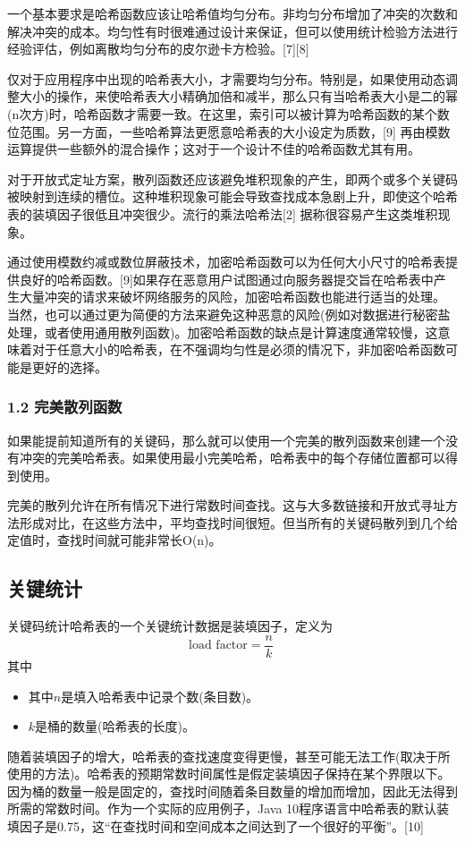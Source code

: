 一个基本要求是哈希函数应该让哈希值均匀分布。非均匀分布增加了冲突的次数和解决冲突的成本。均匀性有时很难通过设计来保证，但可以使用统计检验方法进行经验评估，例如离散均匀分布的皮尔逊卡方检验。[7][8]

仅对于应用程序中出现的哈希表大小，才需要均匀分布。特别是，如果使用动态调整大小的操作，来使哈希表大小精确加倍和减半，那么只有当哈希表大小是二的幂(n次方)时，哈希函数才需要一致。在这里，索引可以被计算为哈希函数的某个数位范围。另一方面，一些哈希算法更愿意哈希表的大小设定为质数，[9] 再由模数运算提供一些额外的混合操作；这对于一个设计不佳的哈希函数尤其有用。

对于开放式定址方案，散列函数还应该避免堆积现象的产生，即两个或多个关键码被映射到连续的槽位。这种堆积现象可能会导致查找成本急剧上升，即使这个哈希表的装填因子很低且冲突很少。流行的乘法哈希法[2] 据称很容易产生这类堆积现象。

通过使用模数约减或数位屏蔽技术，加密哈希函数可以为任何大小尺寸的哈希表提供良好的哈希函数。[9]如果存在恶意用户试图通过向服务器提交旨在哈希表中产生大量冲突的请求来破坏网络服务的风险，加密哈希函数也能进行适当的处理。 当然，也可以通过更为简便的方法来避免这种恶意的风险(例如对数据进行秘密盐处理，或者使用通用散列函数)。加密哈希函数的缺点是计算速度通常较慢，这意味着对于任意大小的哈希表，在不强调均匀性是必须的情况下，非加密哈希函数可能是更好的选择。

\subsubsection{1.2 完美散列函数}
如果能提前知道所有的关键码，那么就可以使用一个完美的散列函数来创建一个没有冲突的完美哈希表。如果使用最小完美哈希，哈希表中的每个存储位置都可以得到使用。

完美的散列允许在所有情况下进行常数时间查找。这与大多数链接和开放式寻址方法形成对比，在这些方法中，平均查找时间很短。但当所有的关键码散列到几个给定值时，查找时间就可能非常长O(n)。

\subsection{关键统计}
关键码统计哈希表的一个关键统计数据是装填因子，定义为
\begin{equation}
\text{load factor} = \frac{n}{k}~
\end{equation}
其中
\begin{itemize}
\item 其中$n$是填入哈希表中记录个数(条目数)。
\item $k$是桶的数量(哈希表的长度)。
\end{itemize}
随着装填因子的增大，哈希表的查找速度变得更慢，甚至可能无法工作(取决于所使用的方法)。哈希表的预期常数时间属性是假定装填因子保持在某个界限以下。因为桶的数量一般是固定的，查找时间随着条目数量的增加而增加，因此无法得到所需的常数时间。作为一个实际的应用例子，Java 10程序语言中哈希表的默认装填因子是0.75，这“在查找时间和空间成本之间达到了一个很好的平衡”。[10]

